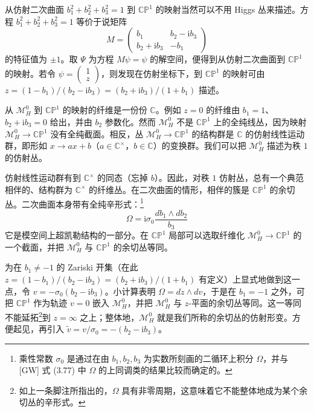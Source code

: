 \documentclass[11pt,a4paper]{article}
\begin{document}
从仿射二次曲面 $b_1^2+b_2^2+b_3^2=1$ 到 $\mathbb{C}\mathbb{P}^1$ 的映射当然可以不用 Higgs 丛来描述。方程 $b_1^2+b_2^2+b_3^2=1$ 等价于说矩阵
\begin{equation}\tag{3.41}
M=
\begin{pmatrix}
b_1 & b_2-\mathrm{i}b_3\\
b_2+\mathrm{i}b_3 & -b_1
\end{pmatrix}
\end{equation}
的特征值为 $\pm1$。取 $\Psi$ 为方程 $M\psi=\psi$ 的解空间，便得到从仿射二次曲面到 $\mathbb{C}\mathbb{P}^1$ 的映射。若令 $\psi=\begin{pmatrix}1\\ z\end{pmatrix}$，则发现在仿射坐标下，到 $\mathbb{C}\mathbb{P}^1$ 的映射可由 $z=(1-b_1)/(b_2-\mathrm{i}b_3)=(b_2+\mathrm{i}b_3)/(1+b_1)$ 描述。

从 $\mathcal{M}_H^0$ 到 $\mathbb{C}\mathbb{P}^1$ 的映射的纤维是一份份 $\mathbb{C}$。例如 $z=0$ 的纤维由 $b_1=1$、$b_2+\mathrm{i}b_3=0$ 给出，并由 $b_2$ 参数化。然而 $\mathcal{M}_H^0$ 不是 $\mathbb{C}\mathbb{P}^1$ 上的全纯线丛，因为映射 $\mathcal{M}_H^0\to\mathbb{C}\mathbb{P}^1$ 没有全纯截面。相反，丛 $\mathcal{M}_H^0\to\mathbb{C}\mathbb{P}^1$ 的结构群是 $\mathbb{C}$ 的仿射线性运动群，即形如 $x\to ax+b$（$a\in\mathbb{C}^\times$，$b\in\mathbb{C}$）的变换群。我们可以把 $\mathcal{M}_H^0$ 描述为秩 $1$ 的仿射丛。

仿射线性运动群有到 $\mathbb{C}^\times$ 的同态（忘掉 $b$）。因此，对秩 $1$ 仿射丛，总有一个典范相伴的、结构群为 $\mathbb{C}^\times$ 的纤维丛。在二次曲面的情形，相伴的簇是 $\mathbb{C}\mathbb{P}^1$ 的余切丛。二次曲面本身带有全纯辛形式：\footnote{乘性常数 $\sigma_0$ 是通过在由 $b_1,b_2,b_3$ 为实数所刻画的二循环上积分 $\Omega$，并与 [GW] 式 (3.77) 中 $\Omega$ 的上同调类的结果比较而确定的。}
\begin{equation}\tag{3.42}
\Omega=\mathrm{i}\sigma_0\frac{db_1\wedge db_2}{b_3}
\end{equation}
它是模空间上超凯勒结构的一部分。在 $\mathbb{C}\mathbb{P}^1$ 局部可以选取纤维化 $\mathcal{M}_H^0\to\mathbb{C}\mathbb{P}^1$ 的一个截面，并把 $\mathcal{M}_H^0$ 与 $\mathbb{C}\mathbb{P}^1$ 的余切丛等同。

为在 $b_1\ne-1$ 的 Zariski 开集（在此 $z=(1-b_1)/(b_2-\mathrm{i}b_3)=(b_2+\mathrm{i}b_3)/(1+b_1)$ 有定义）上显式地做到这一点，令 $v=-\sigma_0(b_2-\mathrm{i}b_3)$。小计算表明 $\Omega=dz\wedge dv$，于是在 $b_1=-1$ 之外，可把 $\mathbb{C}\mathbb{P}^1$ 作为轨迹 $v=0$ 嵌入 $\mathcal{M}_H^0$，并把 $\mathcal{M}_H^0$ 与 $z$-平面的余切丛等同。这一等同不能延拓\footnote{如上一条脚注所指出的，$\Omega$ 具有非零周期，这意味着它不能整体地成为某个余切丛的辛形式。}到 $z=\infty$ 之上；整体地，$\mathcal{M}_H^0$ 就是我们所称的余切丛的仿射形变。方便起见，再引入 $\tilde v=v/\sigma_0=-(b_2-\mathrm{i}b_3)$。
\end{document}
